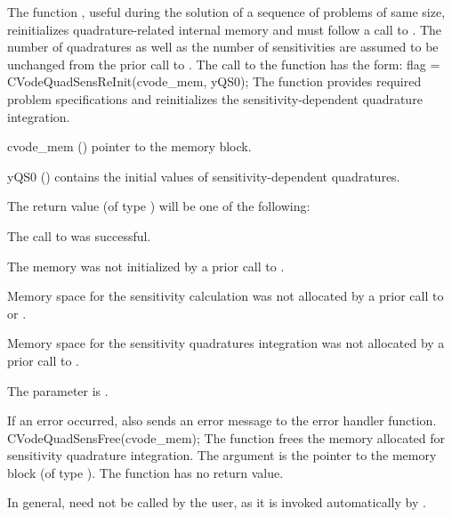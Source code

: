 The function , useful during the solution of a sequence 
of problems of same size, reinitializes quadrature-related internal memory 
and must follow a call to . The number  of 
quadratures as well as the number  of sensitivities are assumed to be 
unchanged from the prior call to .
The call to the  function has the form:
{
  flag = CVodeQuadSensReInit(cvode\_mem, yQS0);
}
{
  The function  provides required problem specifications 
  and reinitializes the sensitivity-dependent quadrature integration.
}
{
  \begin{args}
  \item[cvode\_mem] ()
    pointer to the {\cvodes} memory block.
  \item[yQS0] ()
    contains the initial values of sensitivity-dependent quadratures.
  \end{args}
}
{
  The return value  (of type ) will be one of the following:
  \begin{args}[CV\_NO\_QUADSENS]
  \item[\Id{CV\_SUCCESS}]
    The call to  was successful.
  \item[\Id{CVODE\_MEM\_NULL}] 
    The {\cvodes} memory was not initialized by a prior call to .
  \item[\Id{CV\_NO\_SENS}] 
    Memory space for the sensitivity calculation was not allocated by a prior
    call to  or .
  \item[\Id{CV\_NO\_QUADSENS}] 
    Memory space for the sensitivity quadratures integration was not allocated by a prior
    call to .
  \item[\Id{CV\_ILL\_INPUT}] 
    The parameter  is .
  \end{args}
}
{
  If an error occurred,  also sends an error message to the
  error handler function.
}
{
  CVodeQuadSensFree(cvode\_mem);
}
{
  The function  frees the memory allocated for sensitivity 
  quadrature integration.
}
{
  The argument is the pointer to the {\cvodes} memory block (of type ).
}
{
  The function  has no return value.
}
{
  In general,  need not be called by the user, as it is
  invoked automatically by .

}

